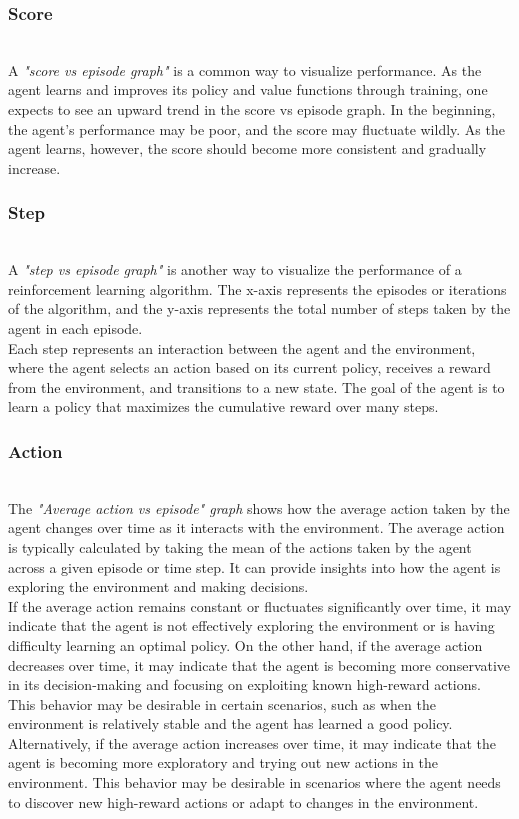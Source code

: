 \documentclass[preprint,12pt]{elsarticle}
\begin{document}
\subsubsection{Score}\\
A \textit{"score vs episode graph"} is a common way to visualize performance. As the agent learns and improves its policy and value functions through training, one expects to see an upward trend in the score vs episode graph. In the beginning, the agent's performance may be poor, and the score may fluctuate wildly. As the agent learns, however, the score should become more consistent and gradually increase.\\

\subsubsection{Step}\\
A \textit{"step vs episode graph"} is another way to visualize the performance of a reinforcement learning algorithm. The x-axis represents the episodes or iterations of the algorithm, and the y-axis represents the total number of steps taken by the agent in each episode.\\
Each step represents an interaction between the agent and the environment, where the agent selects an action based on its current policy, receives a reward from the environment, and transitions to a new state. The goal of the agent is to learn a policy that maximizes the cumulative reward over many steps.\\

\subsubsection{Action}\\
The \textit{"Average action vs episode" graph} shows how the average action taken by the agent changes over time as it interacts with the environment. The average action is typically calculated by taking the mean of the actions taken by the agent across a given episode or time step. It can provide insights into how the agent is exploring the environment and making decisions.\\
If the average action remains constant or fluctuates significantly over time, it may indicate that the agent is not effectively exploring the environment or is having difficulty learning an optimal policy.
On the other hand, if the average action decreases over time, it may indicate that the agent is becoming more conservative in its decision-making and focusing on exploiting known high-reward actions. This behavior may be desirable in certain scenarios, such as when the environment is relatively stable and the agent has learned a good policy.\\
Alternatively, if the average action increases over time, it may indicate that the agent is becoming more exploratory and trying out new actions in the environment. This behavior may be desirable in scenarios where the agent needs to discover new high-reward actions or adapt to changes in the environment.\\
\end{document}
